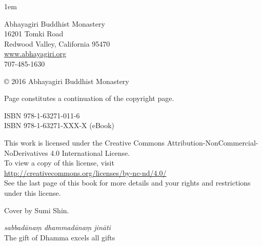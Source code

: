 \thispagestyle{empty}
{\raggedright\small
\parindent 0pt
\parskip 1em

Abhayagiri Buddhist Monastery\\
16201 Tomki Road\\
Redwood Valley, California 95470\\
\href{http://www.abhayagiri.org}{www.abhayagiri.org}\\
707-485-1630

© 2016 Abhayagiri Buddhist Monastery

Page \pageref{credits} constitutes a continuation of the copyright page.

ISBN 978-1-63271-011-6\\
ISBN 978-1-63271-XXX-X (eBook)

This work is licensed under the Creative Commons
Attribution-NonCommercial-NoDerivatives 4.0 International License.\\
To view a copy of this license, visit\\
\href{http://creativecommons.org/licenses/by-nc-nd/4.0}
{http://creativecommons.org/licenses/by-nc-nd/4.0/}\\[.5em]
See the last page of this book for more details and
your rights and restrictions under this license.

Cover by Sumi Shin.

\emph{sabbadānaṃ dhammadānaṃ jināti}\\
The gift of Dhamma excels all gifts

}
\clearpage
